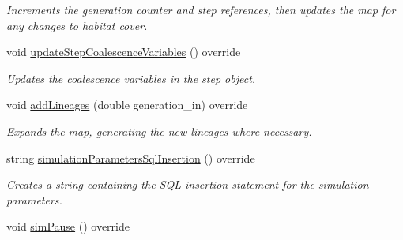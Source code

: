 \begin{DoxyCompactItemize}
\begin{DoxyCompactList}\small\item\em Increments the generation counter and step references, then updates the map for any changes to habitat cover. \end{DoxyCompactList}\item 
void \hyperlink{class_spatial_tree_ad14491fc87b0a9b28f5b8b316ee8a89d}{update\+Step\+Coalescence\+Variables} () override\hypertarget{class_spatial_tree_ad14491fc87b0a9b28f5b8b316ee8a89d}{}\label{class_spatial_tree_ad14491fc87b0a9b28f5b8b316ee8a89d}

\begin{DoxyCompactList}\small\item\em Updates the coalescence variables in the step object. \end{DoxyCompactList}\item 
void \hyperlink{class_spatial_tree_a6e802a5034648cc26b24923f27f85727}{add\+Lineages} (double generation\+\_\+in) override
\begin{DoxyCompactList}\small\item\em Expands the map, generating the new lineages where necessary. \end{DoxyCompactList}\item 
string \hyperlink{class_spatial_tree_acc54786661c182b6df23e57a61716e0f}{simulation\+Parameters\+Sql\+Insertion} () override
\begin{DoxyCompactList}\small\item\em Creates a string containing the S\+QL insertion statement for the simulation parameters. \end{DoxyCompactList}\item 
void \hyperlink{class_spatial_tree_af89289a1dc549102c0137763a7d26065}{sim\+Pause} () override\hypertarget{class_spatial_tree_af89289a1dc549102c0137763a7d26065}{}\label{class_spatial_tree_af89289a1dc549102c0137763a7d26065}


\end{DoxyCompactItemize}
